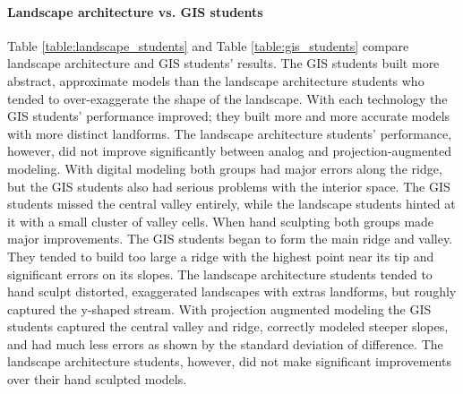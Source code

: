 \documentclass[prodmode,acmtochi]{acmsmall} %
\begin{document}
\paragraph{Landscape architecture vs. GIS students}
%
Table \ref{table:landscape_students} and
Table \ref{table:gis_students}
compare landscape architecture and GIS students' results.
%
The GIS students built more abstract, approximate models
than the landscape architecture students who tended to 
over-exaggerate the shape of the landscape.
%
With each technology the GIS students' 
performance improved;
they built more and more accurate models 
with more distinct landforms.
The landscape architecture students' performance, however, 
did not improve significantly between
analog and projection-augmented modeling. 
With digital modeling both groups
had major errors along the ridge,
but the GIS students also had serious problems
with the interior space.
The GIS students missed
the central valley entirely, while the landscape students
hinted at it with a small cluster of valley cells. 
%
When hand sculpting 
both groups made major improvements.
The GIS students began to form
the main ridge and valley. 
They tended to build too large a ridge
with the highest point near its tip
and significant errors on its slopes. 
The landscape architecture students tended to 
hand sculpt distorted, exaggerated landscapes 
with extras landforms, 
but roughly captured the y-shaped stream. 
%
With projection augmented modeling 
the GIS students captured
the central valley and ridge,
correctly modeled steeper slopes,
and had much less errors as shown by 
the standard deviation of difference.
%
The landscape architecture students, however,
did not make significant improvements 
over their hand sculpted models. 
\end{document}
